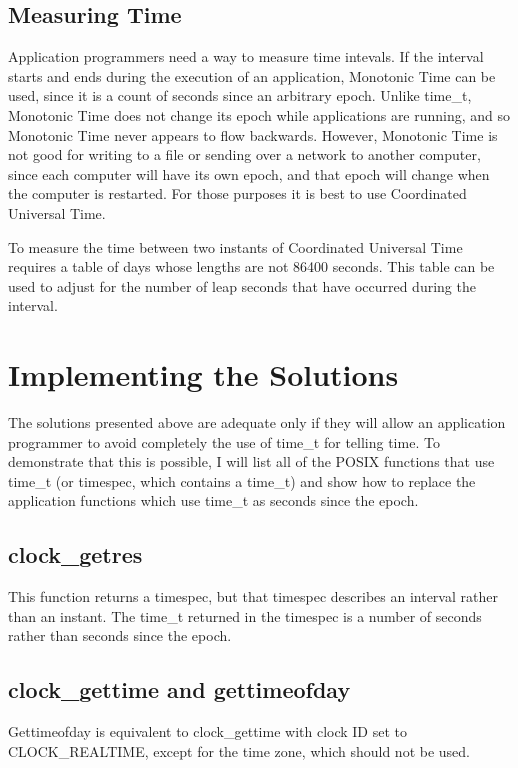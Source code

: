 \documentclass[letterpaper,twoside]{article}
\begin{document}
\subsection{Measuring Time}
Application programmers need a way to measure time intevals.
If the interval starts and ends during the execution of an application,
Monotonic Time
can be used, since it is a count of seconds since an arbitrary epoch.
Unlike {\ttfamily time\_t}, Monotonic Time does not change its epoch while
applications are running, and so Monotonic Time never appears to flow
backwards.  However, Monotonic Time is not good for writing to a file
or sending
over a network to another computer, since each computer will have
its own epoch, and that epoch will change when the computer is restarted.
For those purposes it is best to use Coordinated Universal Time.

To measure the time between two instants of Coordinated Universal Time
requires a table of days whose lengths are not \num{86400} seconds.
This table
can be used to adjust for the number of leap seconds that have occurred
during the interval.

\section{Implementing the Solutions}
The solutions presented above are adequate only if they will allow an
application
programmer to avoid completely the use of {\ttfamily time\_t} for telling time.
To demonstrate that this is possible,
I will list all of the POSIX functions 
that use {\ttfamily time\_t}
(or timespec, which contains a {\ttfamily time\_t}) 
and show how to
replace the application functions which use {\ttfamily time\_t} as
seconds since the epoch.

\subsection{clock\_getres}
This function returns a timespec, but that timespec describes an interval
rather than an instant.  The {\ttfamily time\_t} returned in the timespec is a
number of seconds rather than seconds since the epoch.

\subsection{clock\_gettime and gettimeofday}
Gettimeofday is equivalent to clock\_gettime with clock ID set to
CLOCK\_REAL\-TIME, except for the time zone, which should not be used.
\end{document}
